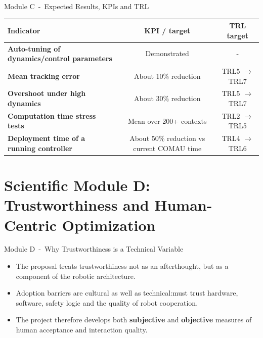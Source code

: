 \documentclass[aspectratio=169,10pt]{beamer}
\begin{document}
\begin{frame}{Module C~-~Expected Results, KPIs and TRL}

\small
\begin{tabularx}{\textwidth}{>{\bfseries}X c c}
\toprule
Indicator & KPI / target & TRL target \\
\midrule
Auto-tuning of dynamics/control parameters & Demonstrated &~-~\\
Mean tracking error & About 10\% reduction & TRL5 $\rightarrow$ TRL7 \\
Overshoot under high dynamics & About 30\% reduction & TRL5 $\rightarrow$ TRL7 \\
Computation time stress tests & Mean over 200+ contexts & TRL2 $\rightarrow$ TRL5 \\
Deployment time of a running controller & About 50\% reduction vs current COMAU time & TRL4 $\rightarrow$ TRL6 \\
\bottomrule
\end{tabularx}

\end{frame}


\section{Scientific Module D: Trustworthiness and Human-Centric Optimization}

\begin{frame}{Module D~-~Why Trustworthiness is a Technical Variable}

\begin{itemize}
  \item The proposal treats trustworthiness not as an afterthought, but as a component of the robotic architecture.
  \item Adoption barriers are cultural as well as technical:\@workers must trust hardware, software, safety logic and the quality of robot cooperation.
  \item The project therefore develops both \textbf{subjective} and \textbf{objective} measures of human acceptance and interaction quality.
\end{itemize}

\end{frame}
\end{document}
